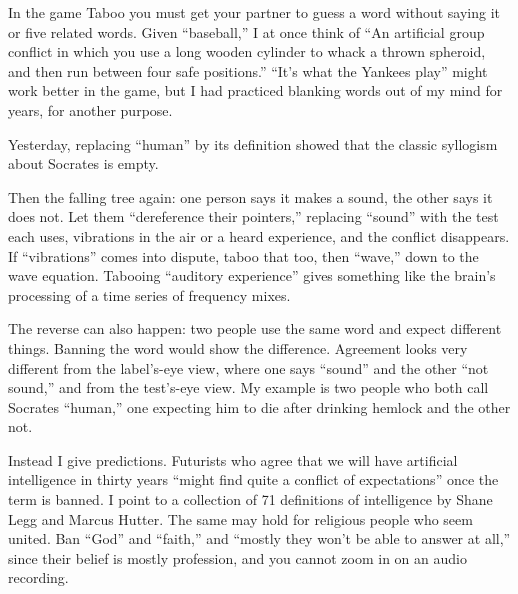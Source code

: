 
In the game Taboo you must get your partner to guess a word without saying it or five related words. Given ``baseball,'' I at once think of ``An artificial group conflict in which you use a long wooden cylinder to whack a thrown spheroid, and then run between four safe positions.'' ``It's what the Yankees play'' might work better in the game, but I had practiced blanking words out of my mind for years, for another purpose.

Yesterday, replacing ``human'' by its definition showed that the classic syllogism about Socrates is empty. 

Then the falling tree again: one person says it makes a sound, the other says it does not. Let them ``dereference their pointers,'' replacing ``sound'' with the test each uses, vibrations in the air or a heard experience, and the conflict disappears. If ``vibrations'' comes into dispute, taboo that too, then ``wave,'' down to the wave equation. Tabooing ``auditory experience'' gives something like the brain's processing of a time series of frequency mixes.

The reverse can also happen: two people use the same word and expect different things. Banning the word would show the difference. Agreement looks very different from the label's-eye view, where one says ``sound'' and the other ``not sound,'' and from the test's-eye view. My example is two people who both call Socrates ``human,'' one expecting him to die after drinking hemlock and the other not. 

Instead I give predictions. Futurists who agree that we will have artificial intelligence in thirty years ``might find quite a conflict of expectations'' once the term is banned. I point to a collection of 71 definitions of intelligence by Shane Legg and Marcus Hutter.  The same may hold for religious people who seem united. Ban ``God'' and ``faith,'' and ``mostly they won't be able to answer at all,'' since their belief is mostly profession, and you cannot zoom in on an audio recording. 

